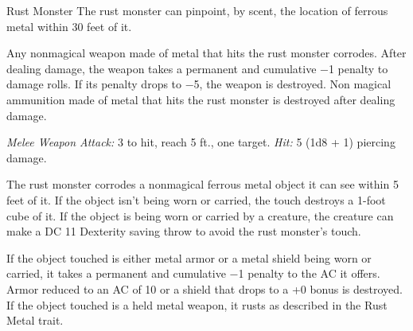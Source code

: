 \documentclass[10pt,a4paper,twoside,bg=print,twocolumn,openany,nodeprecatedcode]{dndbook}
\begin{document}
\begin{DndMonster}[float=t]{Rust Monster}
\DndMonsterBasics[
armor-class = {14 (natural armor)},
hit-points = {\DndDice{5d8 + 5}},
speed = {40 ft.}
]
\DndMonsterAbilityScores[
 str = 13,
 dex = 12,
 con = 13,
 int = 2,
 wis = 13,
 cha = 6
]
\DndMonsterDetails[
senses = {darkvision 60 ft., passive perception 11},
challenge = 1/2,
]
The rust monster can pinpoint, by scent, the location of ferrous metal within 30 feet of it.

Any nonmagical weapon made of metal that hits the rust monster corrodes. After dealing damage, the weapon takes a permanent and cumulative −1 penalty to damage rolls. If its penalty drops to −5, the weapon is destroyed. Non magical ammunition made of metal that hits the rust monster is destroyed after dealing damage.

\textsl{Melee Weapon Attack:} 3 to hit, reach 5 ft., one target. \textsl{Hit:} 5 (1d8 + 1) piercing damage.

The rust monster corrodes a nonmagical ferrous metal object it can see within 5 feet of it. If the object isn't being worn or carried, the touch destroys a 1-foot cube of it. If the object is being worn or carried by a creature, the creature can make a DC 11 Dexterity saving throw to avoid the rust monster's touch.

If the object touched is either metal armor or a metal shield being worn or carried, it takes a permanent and cumulative −1 penalty to the AC it offers. Armor reduced to an AC of 10 or a shield that drops to a +0 bonus is destroyed. If the object touched is a held metal weapon, it rusts as described in the Rust Metal trait.

\end{DndMonster}
\end{document}
